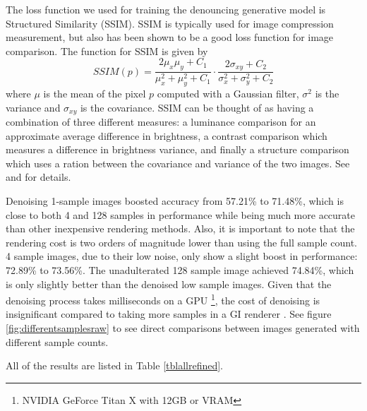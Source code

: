 The loss function we used for training the denouncing generative model is Structured Similarity (SSIM)\cite{Wang04imagequality}. SSIM is typically used for image compression measurement, but also has been shown to be a good loss function for image comparison. The function for SSIM is given by
$$SSIM(p)=\frac{2\mu_x\mu_y + C_1}{\mu_x^2+\mu_y^2+C_1}\cdot\frac{2\sigma_{xy}+C_2}{\sigma_x^2+\sigma_y^2+C_2}$$
where $\mu$ is the mean of the pixel $p$ computed with a Gaussian filter, $\sigma^2$ is the variance and $\sigma_{xy}$ is the covariance. SSIM can be thought of as having a combination of three different measures: a luminance comparison for an approximate average difference in brightness,  a contrast comparison which measures a difference in brightness variance, and finally a structure comparison which uses a ration between the covariance and variance of the two images.  See \cite{DBLP:journals/corr/ZhangSYSLJF16} and \cite{DBLP:journals/corr/ZhaoGFK15} for details.

Denoising 1-sample images boosted accuracy from 57.21\% to 71.48\%, which is close to both 4 and 128 samples in performance while being much more accurate than other inexpensive rendering methods. Also, it is important to note that the rendering cost is two orders of magnitude lower than using the full sample count. 4 sample images, due to their low noise, only show a slight boost in performance: 72.89\% to 73.56\%.  The unadulterated  128 sample image achieved 74.84\%, which is only slightly better than the denoised low sample images.  Given that the denoising process takes milliseconds on a GPU \footnote{NVIDIA GeForce Titan X with 12GB or VRAM}, the cost of denoising is insignificant compared to taking more samples in a GI renderer .  See figure \ref{fig:differentsamplesraw} to see direct comparisons between images generated with different sample counts.

All of the results are listed in Table \ref{tblallrefined}.

